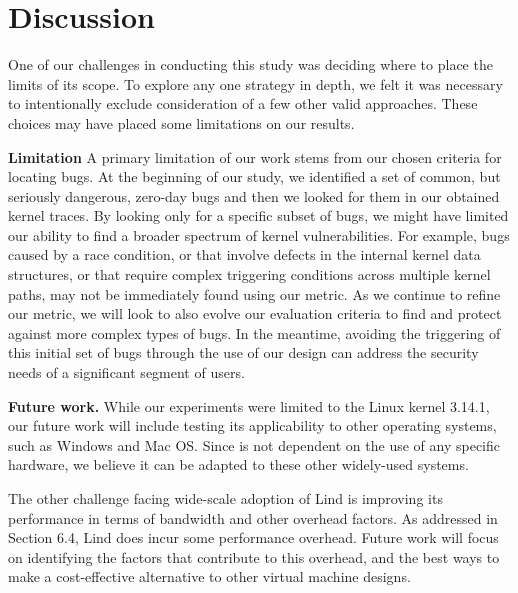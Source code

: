 \section{Discussion}
\label{sec.limitation}

One of our challenges in conducting this study was deciding where to place the
limits of its scope.  To explore any one strategy
in depth, we felt it was necessary to intentionally exclude consideration of
a few other valid approaches. These choices may have placed some limitations on our results.

\textbf{Limitation }
A primary limitation of our work stems from our chosen criteria for locating
bugs. At the beginning
of our study, we identified a set of common, but seriously dangerous, zero-day bugs
and then we looked for them in our obtained kernel traces. By looking only
for a specific subset of bugs, we might have limited our
ability to find a broader spectrum of kernel vulnerabilities. For example, bugs
caused by a race condition, or that involve defects in the internal kernel data
structures, or that require complex triggering conditions across multiple kernel
paths, may not be immediately found using our metric. As we continue to refine
our metric, we will look to also evolve our evaluation
criteria to find and protect against more complex types of bugs.
In the meantime, avoiding the triggering of this initial set of bugs
through the use of our \lip design can address the security
needs of a significant segment of users.

\textbf{Future work.}
While our experiments were limited to the Linux kernel 3.14.1, our future work
will include testing its applicability to other operating systems, such as
Windows and Mac OS. Since \lip is not dependent on the use of any
specific hardware, we believe it can be adapted to these other
widely-used systems.

The other challenge facing wide-scale adoption of Lind is improving its
performance in terms of bandwidth and other overhead factors. As addressed in
Section 6.4, Lind does incur some performance overhead. Future work will focus on identifying
the factors that contribute to this overhead, and the best ways to make \lip
a cost-effective alternative to other virtual machine designs.
